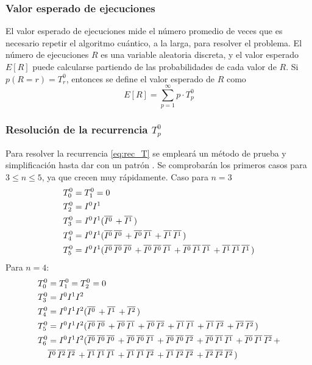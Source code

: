 \subsubsection{Valor esperado de ejecuciones}
%
El valor esperado de ejecuciones mide el número promedio de veces que es 
necesario repetir el algoritmo cuántico, a la larga, para resolver el problema.  
El número de ejecuciones $R$ es una variable aleatoria discreta, y el valor 
esperado $E[R]$ puede calcularse partiendo de las probabilidades de cada valor 
de $R$. Si $p(R=r) = T^0_r$, entonces se define el valor esperado de $R$ como
%
\begin{equation}
	E[R] = \sum^{\infty}_{p=1} p \cdot T^0_p
\end{equation}
%
\subsubsection{Resolución de la recurrencia $T^0_p$}
Para resolver la recurrencia \eqref{eq:rec_T} se empleará un método de prueba y 
simplificación hasta dar con un patrón \cite{mcs}. Se comprobarán los primeros 
casos para $3 \leq n \leq 5$, ya que crecen muy rápidamente.
%
Caso para $n=3$
%
\begin{equation}
\label{eq:rec_T3}
\begin{split}
	T^0_0 &= T^0_1 = 0 \\
	T^0_2 &= I^0I^1 \\
	T^0_3 &= I^0I^1(\NI 0 + \NI 1 ) \\
	T^0_4 &= I^0I^1(\NI 0 \NI 0 + \NI 0 \NI 1  + \NI 1 \NI 1 ) \\
	T^0_5 &= I^0I^1(\NI 0 \NI 0 \NI 0 + \NI 0 \NI 0 \NI 1  + \NI 0 \NI 1 \NI 1 + 
\NI 1 \NI 1 \NI 1) \\
\end{split}
\end{equation}
%
Para $n=4$:
%
\begin{equation}
\begin{split}
	T^0_0 &= T^0_1 = T^0_2 = 0 \\
	T^0_3 &= I^0I^1I^2 \\
	T^0_4 &= I^0I^1I^2 (\overline{I^{0}}\, + \overline{I^{1}}\, + \overline{I^{2}}\,) \\
	T^0_5 &= I^0I^1I^2 (
		\overline{I^{0}}\, \overline{I^{0}}\, +
		\overline{I^{0}}\, \overline{I^{1}}\, +
		\overline{I^{0}}\, \overline{I^{2}}\, +
		\overline{I^{1}}\, \overline{I^{1}}\, +
		\overline{I^{1}}\, \overline{I^{2}}\, +
		\overline{I^{2}}\, \overline{I^{2}}\,) \\
	T^0_6 &= I^0I^1I^2 (
		\overline{I^{0}}\, \overline{I^{0}}\, \overline{I^{0}}\, +
		\overline{I^{0}}\, \overline{I^{0}}\, \overline{I^{1}}\, +
		\overline{I^{0}}\, \overline{I^{0}}\, \overline{I^{2}}\, +
		\overline{I^{0}}\, \overline{I^{1}}\, \overline{I^{1}}\, +
		\overline{I^{0}}\, \overline{I^{1}}\, \overline{I^{2}}\, + \\
		& \overline{I^{0}}\, \overline{I^{2}}\, \overline{I^{2}}\, +
		\overline{I^{1}}\, \overline{I^{1}}\, \overline{I^{1}}\, +
		\overline{I^{1}}\, \overline{I^{1}}\, \overline{I^{2}}\, +
		\overline{I^{1}}\, \overline{I^{2}}\, \overline{I^{2}}\, +
		\overline{I^{2}}\, \overline{I^{2}}\, \overline{I^{2}}\,) \\
\end{split}
\end{equation}
